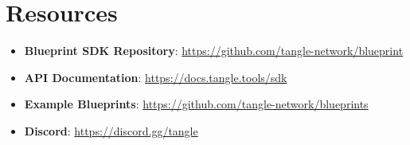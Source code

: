 \documentclass[11pt,a4paper]{article}
\begin{document}
\section{Resources}

\begin{itemize}[noitemsep]
    \item \textbf{Blueprint SDK Repository}: \url{https://github.com/tangle-network/blueprint}
    \item \textbf{API Documentation}: \url{https://docs.tangle.tools/sdk}
    \item \textbf{Example Blueprints}: \url{https://github.com/tangle-network/blueprints}
    \item \textbf{Discord}: \url{https://discord.gg/tangle}
\end{itemize}
\end{document}
